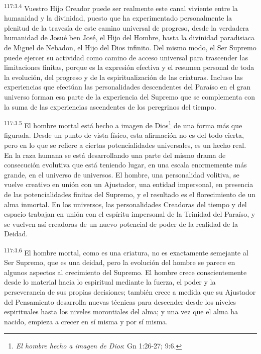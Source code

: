 \par
\textsuperscript{117:3.4} Vuestro Hijo Creador puede ser realmente este canal viviente entre la humanidad y la divinidad, puesto que ha experimentado personalmente la plenitud de la travesía de este camino universal de progreso, desde la verdadera humanidad de Josué ben José, el Hijo del Hombre, hasta la divinidad paradisiaca de Miguel de Nebadon, el Hijo del Dios infinito. Del mismo modo, el Ser Supremo puede ejercer su actividad como camino de acceso universal para trascender las limitaciones finitas, porque es la expresión efectiva y el resumen personal de toda la evolución, del progreso y de la espiritualización de las criaturas. Incluso las experiencias que efectúan las personalidades descendentes del Paraíso en el gran universo forman esa parte de la experiencia del Supremo que se complementa con la suma de las experiencias ascendentes de los peregrinos del tiempo.

\par
\textsuperscript{117:3.5} El hombre mortal está hecho a imagen de Dios\footnote{\textit{El hombre hecho a imagen de Dios}: Gn 1:26-27; 9:6.} de una forma más que figurada. Desde un punto de vista físico, esta afirmación no es del todo cierta, pero en lo que se refiere a ciertas potencialidades universales, es un hecho real. En la raza humana se está desarrollando una parte del mismo drama de consecución evolutiva que está teniendo lugar, en una escala enormemente más grande, en el universo de universos. El hombre, una personalidad volitiva, se vuelve creativo en unión con un Ajustador, una entidad impersonal, en presencia de las potencialidades finitas del Supremo, y el resultado es el florecimiento de un alma inmortal. En los universos, las personalidades Creadoras del tiempo y del espacio trabajan en unión con el espíritu impersonal de la Trinidad del Paraíso, y se vuelven así creadoras de un nuevo potencial de poder de la realidad de la Deidad.

\par
\textsuperscript{117:3.6} El hombre mortal, como es una criatura, no es exactamente semejante al Ser Supremo, que es una deidad, pero la evolución del hombre se parece en algunos aspectos al crecimiento del Supremo. El hombre crece conscientemente desde lo material hacia lo espiritual mediante la fuerza, el poder y la perseverancia de sus propias decisiones; también crece a medida que su Ajustador del Pensamiento desarrolla nuevas técnicas para descender desde los niveles espirituales hasta los niveles morontiales del alma; y una vez que el alma ha nacido, empieza a crecer en sí misma y por sí misma.

